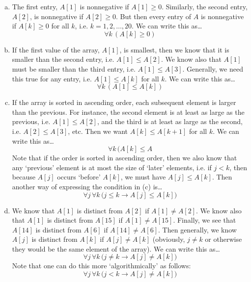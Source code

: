 \documentclass[11pt,letterpaper]{article}
\begin{document}
\sol 
\begin{enumerate}[(a)]
\item The first entry, $A[1]$ is nonnegative if $A[1] \geq 0$. Similarly, the second entry, $A[2]$, is nonnegative if $A[2] \geq 0$. But then every entry of $A$ is nonnegative if $A[k] \geq 0$ for all $k$, i.e. $k= 1, 2, \ldots, 20$. We can write this as\dots
	\[
	\forall k\, (A[k] \geq 0)
	\] \pspace

\item If the first value of the array, $A[1]$, is smallest, then we know that it is smaller than the second entry, i.e. $A[1] \leq A[2]$. We know also that $A[1]$ must be smaller than the third entry, i.e. $A[1] \leq A[3]$. Generally, we need this true for any entry, i.e. $A[1] \leq A[k]$ for all $k$. We can write this as\dots
	\[
	\forall k\, (A[1] \leq A[k])
	\] \pspace

\item If the array is sorted in ascending order, each subsequent element is larger than the previous. For instance, the second element is at least as large as the previous, i.e. $A[1] \leq A[2]$, and the third is at least as large as the second, i.e. $A[2] \leq A[3]$, etc. Then we want $A[k] \leq A[k + 1]$ for all $k$. We can write this as\dots
	\[
	\forall k\, (A[k] \leq A
	\]
Note that if the order is sorted in ascending order, then we also know that any `previous' element is at most the size of `later' elements, i.e. if $j < k$, then because $A[j]$ occurs `before' $A[k]$, we must have $A[j] \leq A[k]$. Then another way of expressing the condition in (c) is\dots
	\[
	\forall j\, \forall k\, \big( j \leq k \to A[j] \leq A[k] \big)
	\] \pspace

\item We know that $A[1]$ is distinct from $A[2]$ if $A[1] \neq A[2]$. We know also that $A[1]$ is distinct from $A[15]$ if $A[1] \neq A[15]$. Finally, we see that $A[14]$ is distinct from $A[6]$ if $A[14] \neq A[6]$. Then generally, we know $A[j]$ is distinct from $A[k]$ if $A[j] \neq A[k]$ (obviously, $j \neq k$ or otherwise they would be the same element of the array). We can write this as\dots
	\[
	\forall j\, \forall k\, \big( j \neq k \to A[j] \neq A[k] \big)
	\]
Note that one can do this more `algorithmically' as follows:
	\[
	\forall j\, \forall k\, \big( j < k \to A[j] \neq A[k] \big)
	\]
\end{enumerate}



\newpage
\end{document}
